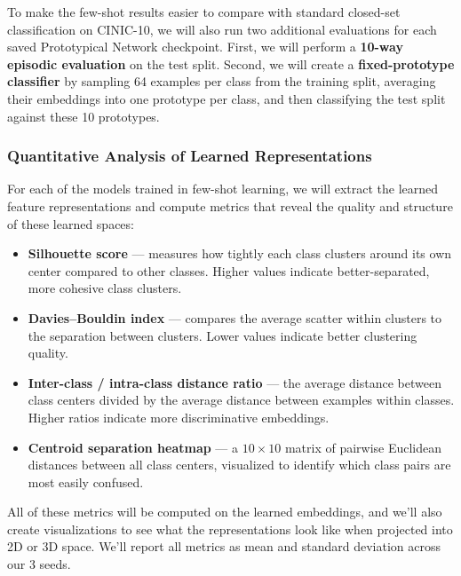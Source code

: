\documentclass[12pt,a4paper]{article}
\begin{document}
To make the few-shot results easier to compare with standard closed-set classification on CINIC-10, we will also run two additional evaluations for each saved Prototypical Network checkpoint. First, we will perform a \textbf{10-way episodic evaluation} on the test split. Second, we will create a \textbf{fixed-prototype classifier} by sampling 64 examples per class from the training split, averaging their embeddings into one prototype per class, and then classifying the test split against these 10 prototypes.

\subsubsection{Quantitative Analysis of Learned Representations}

For each of the models trained in few-shot learning, we will extract the learned feature representations and compute metrics that reveal the quality and structure of these learned spaces:

\begin{itemize}[nosep]
    \item \textbf{Silhouette score} --- measures how tightly each class clusters around its own center compared to other classes. Higher values indicate better-separated, more cohesive class clusters.
    
    \item \textbf{Davies--Bouldin index} --- compares the average scatter within clusters to the separation between clusters. Lower values indicate better clustering quality.
    
    \item \textbf{Inter-class / intra-class distance ratio} --- the average distance between class centers divided by the average distance between examples within classes. Higher ratios indicate more discriminative embeddings.
    
    \item \textbf{Centroid separation heatmap} --- a $10 \times 10$ matrix of pairwise Euclidean distances between all class centers, visualized to identify which class pairs are most easily confused.
\end{itemize}

All of these metrics will be computed on the learned embeddings, and we'll also create visualizations to see what the representations look like when projected into 2D or 3D space. We'll report all metrics as mean and standard deviation across our 3 seeds.
\end{document}
